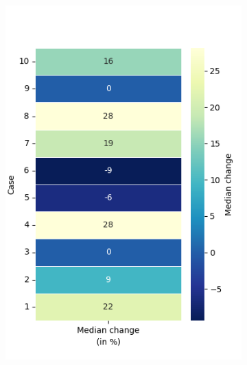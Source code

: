\begin{figure}[h!]
	\begin{subfigure}[t]{0.32\textwidth}
		\centering
		\includegraphics[width=\textwidth]{Figures/DP_median_heatmap_percentage.png}
		\label{fig: DP_median}
		\caption{}
	\end{subfigure}
	\hfill
	\begin{subfigure}[t]{0.32\textwidth}
		\centering

\end{subfigure}
\end{figure}
